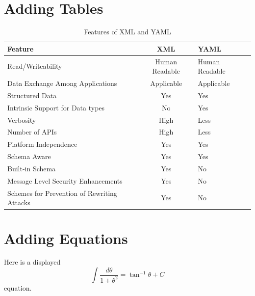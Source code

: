 \section{Adding Tables}

\begin{table}[ht]
\caption{Features of XML and YAML}   %
\label{msgcomm}
\centering                          %
\begin{tabular}{l  c  l }              %
\hline                        %
\cline{1-3}
\hline                        %
\textbf{Feature} & \textbf{XML} & \textbf{YAML} \\ [0.5ex]   %
\hline                              %
\cline{1-3}
Read/Writeability & Human Readable & Human Readable \\               %
Data Exchange Among Applications & Applicable & Applicable \\               %
Structured Data  & Yes & Yes \\               %
Intrinsic Support for Data types & No & Yes \\
Verbosity & High & Less \\
Number of APIs    & High &  Less \\
Platform Independence &Yes & Yes \\
Schema Aware &Yes & Yes \\
Built-in Schema &Yes & No \\
Message Level Security Enhancements &Yes & No \\
Schemes for Prevention of Rewriting Attacks &Yes & No \\

\hline                              %
\cline{1-3}
\end{tabular}
\end{table}


\section{Adding Equations}

Here is a displayed 
\[\int\frac{d\theta} {1+\theta^2}= 
\tan^{-1}\theta+C\] equation. 

